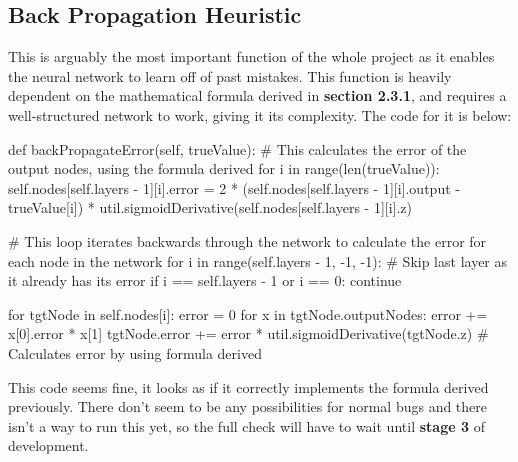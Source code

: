 \documentclass{report}
\begin{document}
\subsection{Back Propagation Heuristic}
This is arguably the most important function of the whole project as it enables the neural network to learn off of past mistakes. This function is heavily dependent on the mathematical formula derived in \textbf{section 2.3.1}, and requires a well-structured network to work, giving it its complexity. The code for it is below:
\begin{python}
def backPropagateError(self, trueValue):
    # This calculates the error of the output nodes, using the formula derived
    for i in range(len(trueValue)):
        self.nodes[self.layers - 1][i].error = 2 * (self.nodes[self.layers - 1][i].output - trueValue[i]) * util.sigmoidDerivative(self.nodes[self.layers - 1][i].z) 
        
    # This loop iterates backwards through the network to calculate the error for each node in the network
    for i in range(self.layers - 1, -1, -1):
        # Skip last layer as it already has its error
        if i == self.layers - 1 or i == 0:
            continue
            
        for tgtNode in self.nodes[i]:
            error = 0
            for x in tgtNode.outputNodes:
                error += x[0].error * x[1]
            tgtNode.error += error * util.sigmoidDerivative(tgtNode.z) # Calculates error by using formula derived
\end{python}
This code seems fine, it looks as if it correctly implements the formula derived previously. There don't seem to be any possibilities for normal bugs and there isn't a way to run this yet, so the full check will have to wait until \textbf{stage 3} of development.
\newpage
\end{document}
